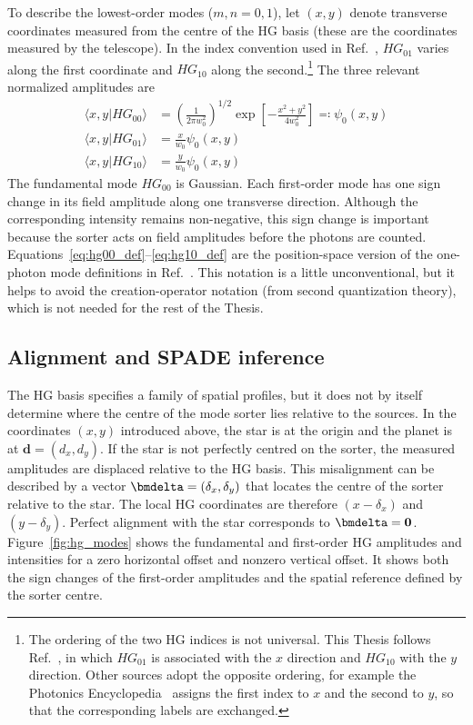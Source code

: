 To describe the lowest-order modes ($m,n=0,1$), let $(x,y)$ denote transverse coordinates measured from the centre of the HG basis (these are the coordinates measured by the telescope).  In the index convention used in Ref.~\cite{Santamaria2024single}, $HG_{01}$ varies along the first coordinate and $HG_{10}$ along the second.\footnote{The ordering of the two HG indices is not universal.  This Thesis follows Ref.~\cite{Santamaria2024single}, in which $HG_{01}$ is associated with the $x$ direction and $HG_{10}$ with the $y$ direction.  Other sources adopt the opposite ordering, for example the Photonics Encyclopedia~\cite{paschotta_hermite_gaussian} assigns the first index to $x$ and the second to $y$, so that the corresponding labels are exchanged.}
The three relevant normalized amplitudes are
\begin{align}
    \langle x,y|HG_{00}\rangle
     & =\left(\frac{1}{2\pi w_0^2}\right)^{1/2}
    \exp\!\left[-\frac{x^2+y^2}{4w_0^2}\right]
    \eqqcolon \psi_0(x,y)
    \label{eq:hg00_def}                         \\
    \langle x,y|HG_{01}\rangle
     & =\frac{x}{w_0}\psi_0(x,y)
    \label{eq:hg01_def}                         \\
    \langle x,y|HG_{10}\rangle
     & =\frac{y}{w_0}\psi_0(x,y)
    \label{eq:hg10_def}
\end{align}
The fundamental mode $HG_{00}$ is Gaussian.  Each first-order mode has one sign change in its field amplitude along one transverse direction.  Although the corresponding intensity remains non-negative, this sign change is important because the sorter acts on field amplitudes before the photons are counted.  Equations~\eqref{eq:hg00_def}--\eqref{eq:hg10_def} are the position-space version of the one-photon mode definitions in Ref.~\cite{Santamaria2024single}.
This notation is a little unconventional, but it helps to avoid the creation-operator notation (from second quantization theory), which is not needed for the rest of the Thesis.

\subsection{Alignment and SPADE inference}

The HG basis specifies a family of spatial profiles, but it does not by itself determine where the centre of the mode sorter lies relative to the sources.  In the coordinates $(x,y)$ introduced above, the star is at the origin and the planet is at $\boldsymbol d=(d_x,d_y)$. If the star is not perfectly centred on the sorter, the measured amplitudes are displaced relative to the HG basis.  This misalignment can be described by a vector $\bmdelta=(\delta_x,\delta_y)$ that locates the centre of the sorter relative to the star.  The local HG coordinates are therefore $(x-\delta_x)$ and $(y-\delta_y)$.  Perfect alignment with the star corresponds to $\bmdelta=\boldsymbol 0$.
Figure~\ref{fig:hg_modes} shows the fundamental and first-order HG amplitudes and intensities for a zero horizontal offset and nonzero vertical offset.  It shows both the sign changes of the first-order amplitudes and the spatial reference defined by the sorter centre.

